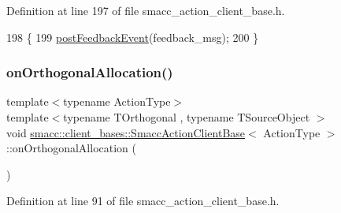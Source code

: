 Definition at line 197 of file smacc\+\_\+action\+\_\+client\+\_\+base.\+h.


\begin{DoxyCode}
198     \{
199         \hyperlink{classsmacc_1_1client__bases_1_1SmaccActionClientBase_ac754fb0adfc982fe1adde0d92842a33b}{postFeedbackEvent}(feedback\_msg);
200     \}
\end{DoxyCode}
\mbox{\label{classsmacc_1_1client__bases_1_1SmaccActionClientBase_a925a611bc8035a0f70248c6ab11f4221}} 
\subsubsection{\texorpdfstring{on\+Orthogonal\+Allocation()}{onOrthogonalAllocation()}}
{\footnotesize\ttfamily template$<$typename Action\+Type$>$ \\
template$<$typename T\+Orthogonal , typename T\+Source\+Object $>$ \\
void \hyperlink{classsmacc_1_1client__bases_1_1SmaccActionClientBase}{smacc\+::client\+\_\+bases\+::\+Smacc\+Action\+Client\+Base}$<$ Action\+Type $>$\+::on\+Orthogonal\+Allocation (\begin{DoxyParamCaption}{ }\end{DoxyParamCaption})\hspace{0.3cm}{\ttfamily [inline]}}



Definition at line 91 of file smacc\+\_\+action\+\_\+client\+\_\+base.\+h.


